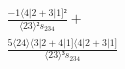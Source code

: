 \documentclass[varwidth, border=5pt]{standalone}
\begin{document}
\begin{my}
$\begin{gathered}
\scriptscriptstyle\frac{-1⟨4|2+3|1]²}{⟨23⟩²s_{234}} +\\
\scriptscriptstyle\frac{5⟨24⟩⟨3|2+4|1]⟨4|2+3|1]}{⟨23⟩³s_{234}} \phantom{+}
\end{gathered}$
\end{my}
\end{document}
